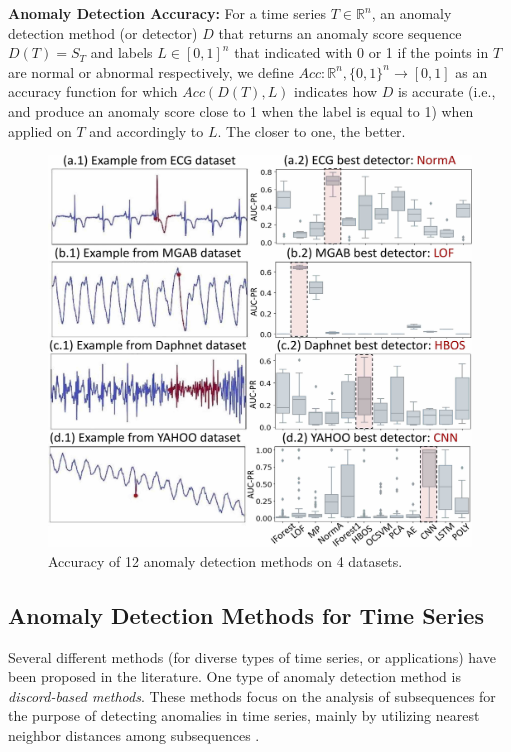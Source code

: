 \textbf{Anomaly Detection Accuracy: }For a time series $T \in \mathbb{R}^n $, an anomaly detection method (or detector) $D$ that returns an anomaly score sequence $D(T) = S_T$ and labels $L \in [0,1]^n$ that indicated with 0 or 1 if the points in $T$ are normal or abnormal respectively, we define $Acc:\mathbb{R}^n,\{0,1\}^n \rightarrow [0,1]$ as an accuracy function for which $Acc(D(T),L)$ indicates how $D$ is accurate (i.e., and produce an anomaly score close to 1 when the label is equal to 1) when applied on $T$ and accordingly to $L$. The closer to one, the better.

\begin{figure}
    \centering
    \includegraphics[width=0.91\linewidth]{figures/2_diversity_method.jpg}
    \vspace{-0.3cm}
    \caption{Accuracy of 12 anomaly detection methods on 4 datasets.}
    \vspace{-0.3cm}
    \label{fig:diversity}
\end{figure}

\vspace{-0.2cm}
\subsection{Anomaly Detection Methods for Time Series}
\label{sec:ad_methods}

Several different methods (for diverse types of time series, or applications) have been proposed in the literature. One type of anomaly detection method is \textit{discord-based methods}. These methods focus on the analysis of subsequences for the purpose of detecting anomalies in time series, mainly by utilizing nearest neighbor distances among subsequences \cite{DBLP:conf/icdm/YehZUBDDSMK16,DBLP:conf/edbt/Senin0WOGBCF15,Keogh2007,Liu2009,DBLP:conf/adma/FuLKL06,DBLP:conf/sdm/BuLFKPM07,DBLP:journals/datamine/LinardiZPK20}. 

